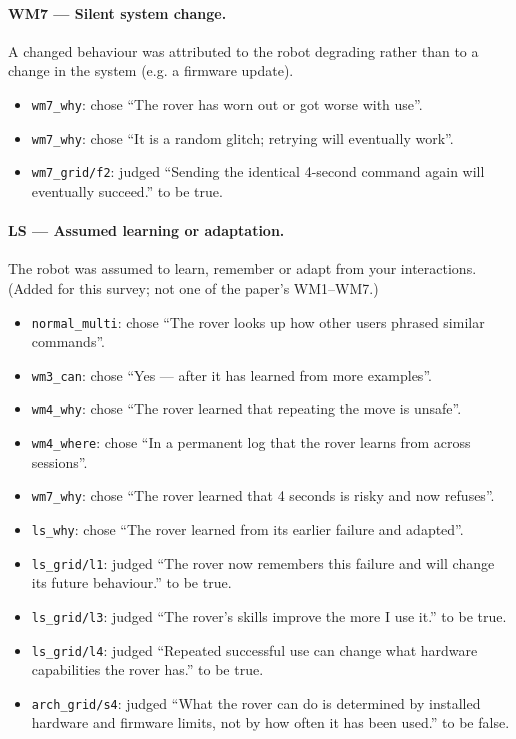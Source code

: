 \paragraph{WM7 --- Silent system change.} A changed behaviour was attributed to the robot degrading rather than to a change in the system (e.g. a firmware update).
\begin{itemize}
\item \texttt{wm7\_why}: chose \textquotedblleft{}The rover has worn out or got worse with use\textquotedblright{}.
\item \texttt{wm7\_why}: chose \textquotedblleft{}It is a random glitch; retrying will eventually work\textquotedblright{}.
\item \texttt{wm7\_grid/f2}: judged \textquotedblleft{}Sending the identical 4-second command again will eventually succeed.\textquotedblright{} to be true.
\end{itemize}
\paragraph{LS --- Assumed learning or adaptation.} The robot was assumed to learn, remember or adapt from your interactions. (Added for this survey; not one of the paper's WM1--WM7.)
\begin{itemize}
\item \texttt{normal\_multi}: chose \textquotedblleft{}The rover looks up how other users phrased similar commands\textquotedblright{}.
\item \texttt{wm3\_can}: chose \textquotedblleft{}Yes --- after it has learned from more examples\textquotedblright{}.
\item \texttt{wm4\_why}: chose \textquotedblleft{}The rover learned that repeating the move is unsafe\textquotedblright{}.
\item \texttt{wm4\_where}: chose \textquotedblleft{}In a permanent log that the rover learns from across sessions\textquotedblright{}.
\item \texttt{wm7\_why}: chose \textquotedblleft{}The rover learned that 4 seconds is risky and now refuses\textquotedblright{}.
\item \texttt{ls\_why}: chose \textquotedblleft{}The rover learned from its earlier failure and adapted\textquotedblright{}.
\item \texttt{ls\_grid/l1}: judged \textquotedblleft{}The rover now remembers this failure and will change its future behaviour.\textquotedblright{} to be true.
\item \texttt{ls\_grid/l3}: judged \textquotedblleft{}The rover's skills improve the more I use it.\textquotedblright{} to be true.
\item \texttt{ls\_grid/l4}: judged \textquotedblleft{}Repeated successful use can change what hardware capabilities the rover has.\textquotedblright{} to be true.
\item \texttt{arch\_grid/s4}: judged \textquotedblleft{}What the rover can do is determined by installed hardware and firmware limits, not by how often it has been used.\textquotedblright{} to be false.
\end{itemize}
